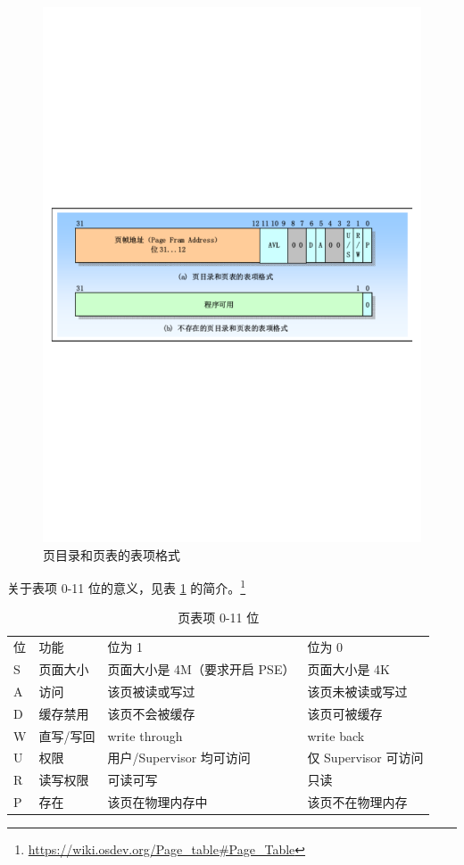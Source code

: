 \begin{figure}[htbp]
    \centering
    \includegraphics[width=\textwidth]{img/页目录和页表的表项格式.pdf}
    \caption{页目录和页表的表项格式}
    \label{fig:页目录和页表的表项格式址}
\end{figure}

关于表项 0-11 位的意义，见表 \ref{tab:页表项 0-11 位} 的简介。\footnote{\url{https://wiki.osdev.org/Page\_table\#Page\_Table}}

\begin{table}[]
\caption{页表项 0-11 位}
\label{tab:页表项 0-11 位}
\begin{tabular}{llll}
位 & 功能 & 位为 1 & 位为 0 \\
S & 页面大小 & 页面大小是 4M（要求开启 PSE） & 页面大小是 4K \\
A & 访问 & 该页被读或写过 & 该页未被读或写过 \\
D & 缓存禁用 & 该页不会被缓存 & 该页可被缓存 \\
W & 直写/写回 & write through & write back \\
U & 权限 & 用户/Supervisor 均可访问 & 仅 Supervisor 可访问 \\
R & 读写权限 & 可读可写 & 只读 \\
P & 存在 & 该页在物理内存中 & 该页不在物理内存
\end{tabular}
\end{table}

